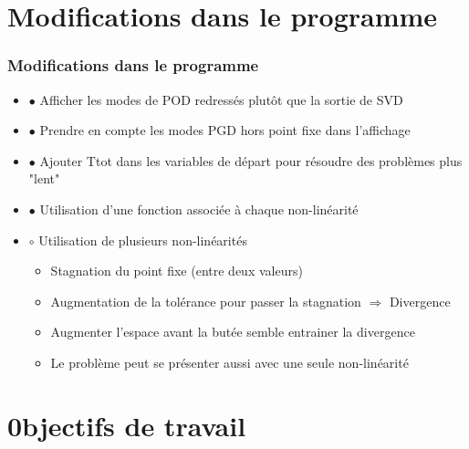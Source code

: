 \documentclass[12pt]{beamer}
\newcommand\FontReduce{\fontsize{8}{10}\selectfont}
\begin{document}
\section{Modifications dans le programme}
	\begin{frame}
		\frametitle{Modifications dans le programme}
		\begin{itemize}
			\item $\bullet$ Afficher les modes de POD redressés plutôt que la sortie de SVD
			\item $\bullet$ Prendre en compte les modes PGD hors point fixe dans l'affichage
			\item $\bullet$ Ajouter Ttot dans les variables de départ pour résoudre des problèmes plus "lent"
			\item $\bullet$ Utilisation d'une fonction associée à chaque non-linéarité
			\item $\circ$ Utilisation de plusieurs non-linéarités
				\begin{itemize}
					\FontReduce
					\item Stagnation du point fixe (entre deux valeurs)
					\item Augmentation de la tolérance pour passer la stagnation $\Rightarrow$ Divergence
					\item Augmenter l'espace avant la butée semble entrainer la divergence
					\item Le problème peut se présenter aussi avec une seule non-linéarité
				\end{itemize}
		\end{itemize}
	\end{frame}
\section{0bjectifs de travail}
\end{document}
